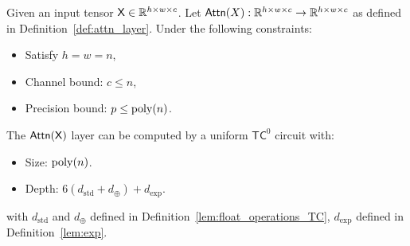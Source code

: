 \begin{lemma}\label{lem:attn_tc0_formal}
     Given an input tensor $\mathsf{X} \in \mathbb{R}^{h \times w \times c}$. Let $\mathsf{Attn}(X):\mathbb{R}^{h \times w \times c} \to \mathbb{R}^{h \times w \times c}$ as defined in Definition~\ref{def:attn_layer}. Under the following constraints:
     \begin{itemize}
         \item Satisfy $h = w = n$,
         \item Channel bound: $c \leq n$,
         \item Precision bound: $p \leq \operatorname{poly}(n)$.
     \end{itemize}
     The $\mathsf{Attn}(\mathsf{X})$ layer can be computed by a uniform $\mathsf{TC}^0$ circuit with:
     \begin{itemize}
        \item Size: $\operatorname{poly}(n)$.
        \item Depth: $6(d_{\mathrm{std}} + d_{\oplus}) + d_{\exp}$.
     \end{itemize}    
     with $d_{\mathrm{std}}$ and $d_{\oplus}$ defined in Definition~\ref{lem:float_operations_TC}, $d_{\exp}$ defined in Definition~\ref{lem:exp}. 
\end{lemma}

